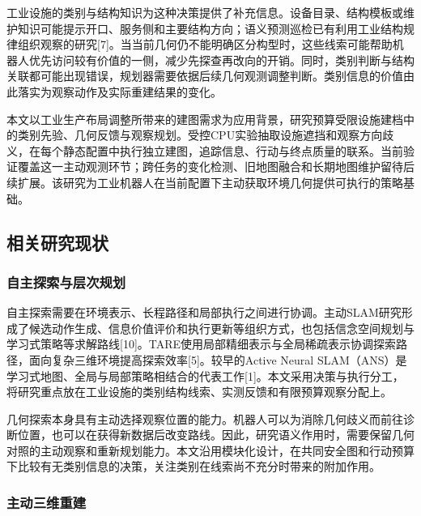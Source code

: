 \documentclass[11pt,a4paper]{article}
\numberwithin{equation}{section}
\begin{document}
工业设施的类别与结构知识为这种决策提供了补充信息。设备目录、结构模板或维护知识可能提示开口、服务侧和主要结构方向；语义预测巡检已有利用工业结构规律组织观察的研究{[}7{]}。当当前几何仍不能明确区分构型时，这些线索可能帮助机器人优先访问较有价值的一侧，减少先探查再改向的开销。同时，类别判断与结构关联都可能出现错误，规划器需要依据后续几何观测调整判断。类别信息的价值由此落实为观察动作及实际重建结果的变化。

本文以工业生产布局调整所带来的建图需求为应用背景，研究预算受限设施建档中的类别先验、几何反馈与观察规划。受控CPU实验抽取设施遮挡和观察方向歧义，在每个静态配置中执行独立建图，追踪信息、行动与终点质量的联系。当前验证覆盖这一主动观测环节；跨任务的变化检测、旧地图融合和长期地图维护留待后续扩展。该研究为工业机器人在当前配置下主动获取环境几何提供可执行的策略基础。

\hypertarget{ux76f8ux5173ux7814ux7a76ux73b0ux72b6}{%
\subsection{相关研究现状}\label{ux76f8ux5173ux7814ux7a76ux73b0ux72b6}}

\hypertarget{ux81eaux4e3bux63a2ux7d22ux4e0eux5c42ux6b21ux89c4ux5212}{%
\subsubsection{自主探索与层次规划}\label{ux81eaux4e3bux63a2ux7d22ux4e0eux5c42ux6b21ux89c4ux5212}}

自主探索需要在环境表示、长程路径和局部执行之间进行协调。主动SLAM研究形成了候选动作生成、信息价值评价和执行更新等组织方式，也包括信念空间规划与学习式策略等求解路线{[}10{]}。TARE使用局部精细表示与全局稀疏表示协调探索路径，面向复杂三维环境提高探索效率{[}5{]}。较早的Active Neural SLAM（ANS）是学习式地图、全局与局部策略相结合的代表工作{[}1{]}。本文采用决策与执行分工，将研究重点放在工业设施的类别结构线索、实测反馈和有限预算观察分配上。

几何探索本身具有主动选择观察位置的能力。机器人可以为消除几何歧义而前往诊断位置，也可以在获得新数据后改变路线。因此，研究语义作用时，需要保留几何对照的主动观察和重新规划能力。本文沿用模块化设计，在共同安全图和行动预算下比较有无类别信息的决策，关注类别在线索尚不充分时带来的附加作用。

\hypertarget{ux4e3bux52a8ux4e09ux7ef4ux91cdux5efa}{%
\subsubsection{主动三维重建}\label{ux4e3bux52a8ux4e09ux7ef4ux91cdux5efa}}
\end{document}
